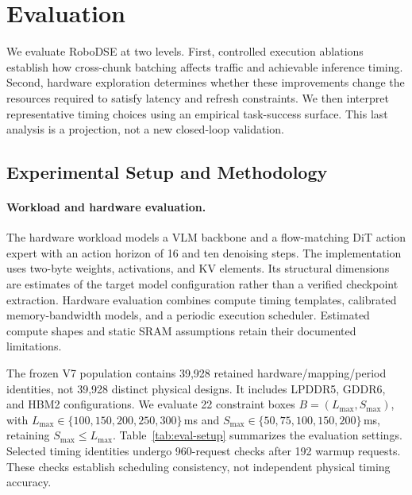 \section{Evaluation}
\label{sec:eval}

We evaluate RoboDSE at two levels. First, controlled execution ablations
establish how cross-chunk batching affects traffic and achievable inference
timing. Second, hardware exploration determines whether these improvements
change the resources required to satisfy latency and refresh constraints.
We then interpret representative timing choices using an empirical task-success
surface. This last analysis is a projection, not a new closed-loop validation.

\subsection{Experimental Setup and Methodology}
\label{sec:eval-setup}

\paragraph{Workload and hardware evaluation.}
The hardware workload models a VLM backbone and a flow-matching DiT action
expert with an action horizon of 16 and ten denoising steps. The implementation
uses two-byte weights, activations, and KV elements. Its structural dimensions
are estimates of the target model configuration rather than a verified
checkpoint extraction. Hardware evaluation combines compute timing templates,
calibrated memory-bandwidth models, and a periodic execution scheduler.
Estimated compute shapes and static SRAM assumptions retain their documented
limitations.

The frozen V7 population contains 39,928 retained hardware/mapping/period
identities, not 39,928 distinct physical designs. It includes LPDDR5, GDDR6,
and HBM2 configurations. We evaluate 22 constraint boxes
$B=(L_{\max},S_{\max})$, with $L_{\max}\in\{100,150,200,250,300\}$\,ms and
$S_{\max}\in\{50,75,100,150,200\}$\,ms, retaining $S_{\max}\leq L_{\max}$.
Table~\ref{tab:eval-setup} summarizes the evaluation settings. Selected timing
identities undergo 960-request checks after 192 warmup requests. These checks
establish scheduling consistency, not independent physical timing accuracy.


